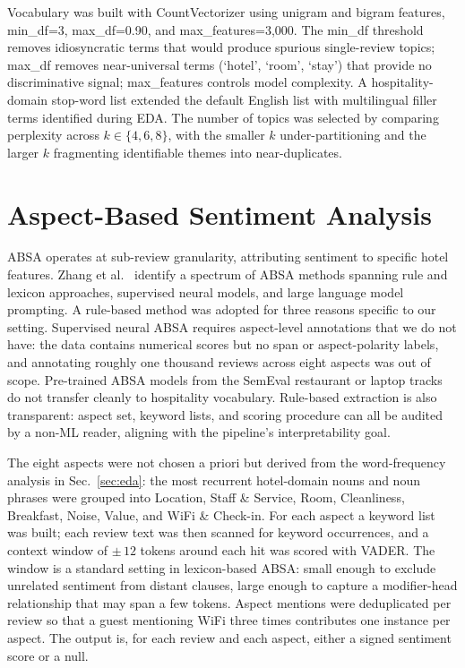 \documentclass[runningheads]{llncs}
\begin{document}
Vocabulary was built with CountVectorizer using unigram and bigram
features, min\_df=3, max\_df=0.90, and max\_features=3{,}000. The min\_df
threshold removes idiosyncratic terms that would produce spurious
single-review topics; max\_df removes near-universal terms (`hotel',
`room', `stay') that provide no discriminative signal; max\_features
controls model complexity. A hospitality-domain stop-word list extended
the default English list with multilingual filler terms identified during
EDA. The number of topics was selected by comparing perplexity across
$k \in \{4, 6, 8\}$, with the smaller $k$ under-partitioning and the
larger $k$ fragmenting identifiable themes into near-duplicates.

\section{Aspect-Based Sentiment Analysis}
\label{sec:absa}

ABSA operates at sub-review granularity, attributing sentiment to
specific hotel features. Zhang et al.~\cite{zhang2022} identify a
spectrum of ABSA methods spanning rule and lexicon approaches,
supervised neural models, and large language model prompting. A
rule-based method was adopted for three reasons specific to our setting.
Supervised neural ABSA requires aspect-level annotations that we do not
have: the data contains numerical scores but no span or aspect-polarity
labels, and annotating roughly one thousand reviews across eight
aspects was out of scope. Pre-trained ABSA models from the SemEval
restaurant or laptop tracks do not transfer cleanly to hospitality
vocabulary. Rule-based extraction is also transparent: aspect set,
keyword lists, and scoring procedure can all be audited by a non-ML
reader, aligning with the pipeline's interpretability goal.

The eight aspects were not chosen a priori but derived from the
word-frequency analysis in Sec.~\ref{sec:eda}: the most recurrent
hotel-domain nouns and noun phrases were grouped into Location, Staff \&
Service, Room, Cleanliness, Breakfast, Noise, Value, and WiFi \&
Check-in. For each aspect a keyword list was built; each review text
was then scanned for keyword occurrences, and a context window of
${\pm}\,12$ tokens around each hit was scored with VADER. The window is a
standard setting in lexicon-based ABSA: small enough to exclude
unrelated sentiment from distant clauses, large enough to capture a
modifier-head relationship that may span a few tokens. Aspect mentions
were deduplicated per review so that a guest mentioning WiFi three
times contributes one instance per aspect. The output is, for each
review and each aspect, either a signed sentiment score or a null.
\end{document}
